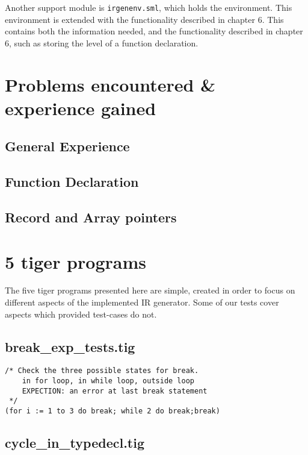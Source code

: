 \documentclass{article}
\begin{document}
Another support module is \texttt{irgenenv.sml}, which holds the environment. This environment is extended with the functionality described in chapter 6. This contains both the information needed, and the functionality described in chapter 6, such as storing the level of a function declaration.

\section{Problems encountered \& experience gained}

\subsection{General Experience}

\subsection{Function Declaration}

\subsection{Record and Array pointers}

\section{5 tiger programs}

The five tiger programs presented here are simple, created in order to focus on different aspects of the implemented IR generator. Some of our tests cover aspects which provided test-cases do not.


\subsection{break\_exp\_tests.tig}

\begin{lstlisting}[frame=single]
/* Check the three possible states for break.
	in for loop, in while loop, outside loop
	EXPECTION: an error at last break statement
 */
(for i := 1 to 3 do break; while 2 do break;break)
\end{lstlisting}

\subsection{cycle\_in\_typedecl.tig}
\end{document}
